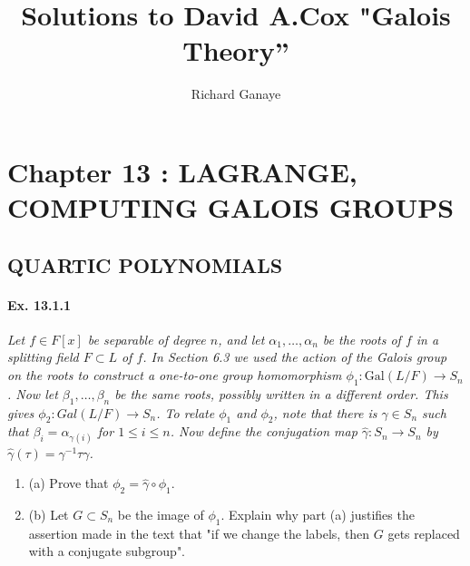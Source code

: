 \documentclass[11pt,a4paper]{article}
\title{Solutions to David A.Cox  "Galois Theory''}
\author{Richard Ganaye}
\newcommand{\be} {\begin{enumerate}}
\newcommand{\ee} {\end{enumerate}}
\newcommand{\Gal}{\mathrm{Gal}}
\begin{document}
\maketitle

\section{Chapter 13 : LAGRANGE, COMPUTING GALOIS GROUPS}

\subsection{QUARTIC POLYNOMIALS}
\paragraph{Ex. 13.1.1}

{\it Let $f \in F[x]$ be separable of degree $n$, and let $\alpha_1,\ldots,\alpha_n$ be the roots of $f$ in a splitting field $F\subset L$ of $f$. In Section 6.3 we used the action of the Galois group on the roots to construct a one-to-one group homomorphism $\phi_1:\Gal(L/F) \to S_n$. Now let $\beta_1,\ldots,\beta_n$ be the same roots, possibly written in a different order. This gives $\phi_2 : Gal(L/F) \to S_n$. To relate $\phi_1$ and $\phi_2$, note that there is $\gamma \in S_n$ such that $\beta_i = \alpha_{\gamma(i)}$ for $1\leq i \leq n$. Now define the conjugation map $\hat{\gamma}:S_n \to S_n$ by $\hat{\gamma}(\tau) = \gamma^{-1} \tau \gamma$.
\be
\item[(a)] Prove that $\phi_2 = \hat{\gamma} \circ \phi_1$.
\item[(b)] Let $G \subset S_n$ be the image of $\phi_1$. Explain why part (a) justifies the assertion made in the text that "if we change the labels, then $G$ gets replaced with a conjugate subgroup".
\ee
}
\end{document}
